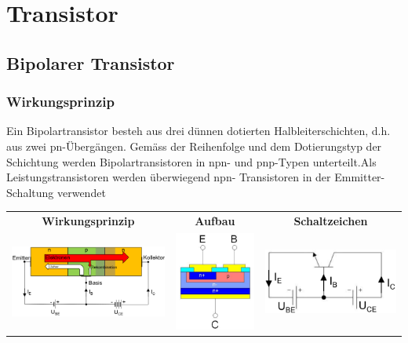 \vspace{-0.5cm}
\section{Transistor}
\vspace{-0.2cm}
\subsection{Bipolarer Transistor}
\vspace{-0.2cm}
\subsubsection{Wirkungsprinzip}
Ein Bipolartransistor besteh aus drei dünnen dotierten Halbleiterschichten, d.h. aus zwei pn-Übergängen. Gemäss der Reihenfolge und dem Dotierungstyp der Schichtung werden Bipolartransistoren in npn- und pnp-Typen unterteilt.\newline Als Leistungstransistoren werden überwiegend npn- Transistoren in der Emmitter-Schaltung verwendet\newline

\begin{tabular}{ccc}
     \textbf{Wirkungsprinzip}&\textbf{Aufbau}&\textbf{Schaltzeichen}\\
     \includegraphics[width=0.35\linewidth]{images/npnTransistor}&
     \includegraphics[width=0.15\linewidth]{images/aufbautransnpn}&
     \includegraphics[width=0.25\linewidth]{images/esbtransnpn} \\
\end{tabular}

